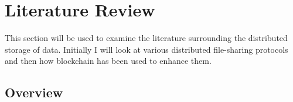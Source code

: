 
\chapter{Literature Review}\label{ch:lit-review}

This section will be used to examine the literature surrounding the distributed storage of data. Initially I will look at various distributed file-sharing protocols and then how blockchain has been used to enhance them.




\section{Overview}